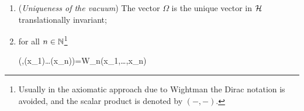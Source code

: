 \documentclass[../main/main.tex]{subfiles}
\begin{document}
\begin{theorem}
\begin{enumerate}[label=(\arabic*'), resume]
		\begin{eq}
			=0 \tif (x-y)^2<0
		\end{eq}
		or more precisely, in terms of smeared fields $f,g$,
		\begin{eq}
			=0 \tif \supp f\sls \supp g
		\end{eq}
		where $\sls$ denotes that the two regions are space-like separated,
		\item (\emph{Uniqueness of the vacuum}) The vector $\Omega$ is the unique vector in $\mathcal H$ translationally invariant;
		\item for all $n\in \mathbb{N}$\footnote{Usually in the axiomatic approach due to Wightman the Dirac notation is avoided, and the scalar product is denoted by $(-,-)$.}
		\begin{eq}\label{eq:reconstr_thm_prop_9}
			(\Omega,\ophi(x_1)\ldots\ophi(x_n)\Omega)=W_n(x_1,\ldots,x_n)
		\end{eq}
	\end{enumerate}
\end{theorem}
\end{document}

